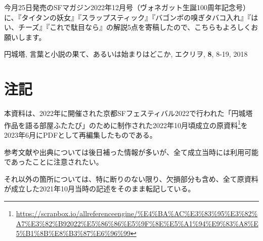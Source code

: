 \documentclass[10pt, a5paper, twoside]{jsarticle}
\theoremstyle{definition}
\begin{document}
		今月25日発売のSFマガジン2022年12月号（ヴォネガット生誕100周年記念号）に、『タイタンの妖女』『スラップスティック』『バゴンボの嗅ぎタバコ入れ』『はい、チーズ』『これで駄目なら』の解説5点を寄稿したので、こちらもよろしくお願いします。

	\begin{thebibliography}{99}

		 円城塔, 言葉と小説の果て、あるいは始まりはどこか, エクリヲ, \textbf{8}, 8-19, 2018

	\end{thebibliography}

	\clearpage

	\section*{注記}

		本資料は、2022年に開催された京都SFフェスティバル2022で行われた「円城塔作品を語る部屋ふたたび」のために制作された2022年10月頃成立の原資料\footnote{\url{https://scrapbox.io/allreferenceengine/%E4%BA%AC%E3%83%95%E3%82%A7%E3%82%B92022%E5%86%86%E5%9F%8E%E5%A1%94%E9%83%A8%E5%B1%8B%E8%B3%87%E6%96%99}}を2023年6月にPDFとして再編集したものである。

		参考文献や出典については後日補った情報が多いが、全て成立当時には利用可能であったことに注意されたい。

		それ以外の箇所については、特に断りのない限り、欠損部分も含め、全て原資料が成立した2021年10月当時の記述をそのまま転記している。
\end{document}
